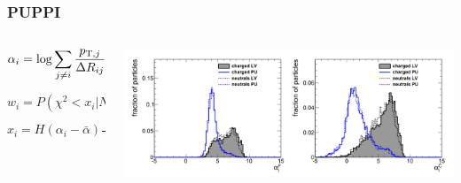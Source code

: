 \documentclass[aspectratio=169,xcolor=dvipsnames,,table,compress]{beamer}
\begin{document}
\begin{frame} \frametitle{PUPPI}
  \vspace{-3mm}
  \begin{columns}
    \begin{column}{0.5\textwidth}
      \[
        \alpha_i = \log \sum_{j \neq i} \frac{p_{\mathrm{T},j}}{\Delta R_{ij}} H(\Delta R_{ij} - R_{\min})H(R_0 - \Delta R_{ij})
      \]
      \begin{itemize}
      \end{itemize}
      \[w_i = P(\chi^2<x_i|N_\mathrm{dof}=1)\]
      \[x_i = H(\alpha_i - \bar\alpha) \frac{(\alpha_i - \bar\alpha)^2}{\sigma^2}\]
    \end{column}
    \begin{column}{0.5\textwidth}
      \includegraphics[width=\textwidth]{../figures/cms/puppi.png}
    \end{column}
  \end{columns}
\end{frame}
 
\end{document}
